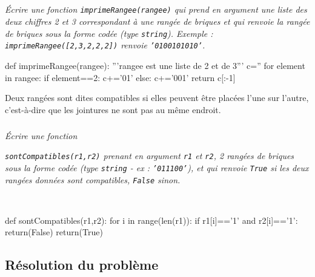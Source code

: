 \else
\fi



\subparagraph{}\textit{\'Ecrire une fonction \texttt{imprimeRangee(rangee)} qui prend en argument une liste des deux chiffres 2 et 3 correspondant à une rangée de briques et qui renvoie la rangée de briques sous la forme codée (type \texttt{string}). Exemple : \texttt{imprimeRangee([2,3,2,2,2])} renvoie \texttt{'0100101010'}.}

\ifprof
\begin{corrige}
\begin{python}
def imprimeRangee(rangee):
    '''rangee est une liste de 2 et de 3'''
    c=''
    for element in rangee:
        if element==2:
            c+='01'
        else:
            c+='001'
    return c[:-1]
\end{python}
\end{corrige}
\else
\fi


Deux rangées sont dites compatibles si elles peuvent être placées l'une sur l'autre, c'est-à-dire que les jointures ne sont pas au même endroit.

\subparagraph{}\textit{\'Ecrire une fonction}

\textit{ \texttt{sontCompatibles(r1,r2)} prenant en argument \texttt{r1} et \texttt{r2}, 2 rangées de briques sous la forme codée (type \texttt{string} - ex : \texttt{'011100'}), et qui renvoie \texttt{True} si les deux rangées données sont compatibles, \texttt{False} sinon.}


\ifprof
\begin{corrige}~\\

\begin{python}
def sontCompatibles(r1,r2):
    for i in range(len(r1)):
        if r1[i]=='1' and r2[i]=='1':
            return(False)
    return(True)
\end{python}
\end{corrige}
\else
\fi


\subsection*{Résolution du problème}
\label{sec:resolution}



